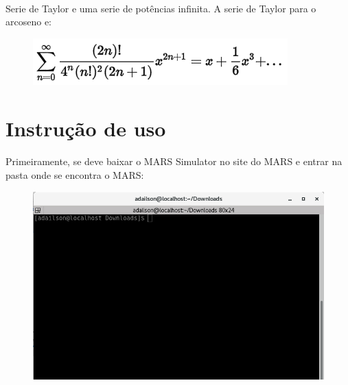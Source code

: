 \documentclass[a4paper, 12pt]{article}
\begin{document}
	\paragraph{}	S\´erie de Taylor \´e uma s\´erie de pot\^encias infinita. A s\´erie de Taylor para o arcoseno \´e:
	\begin{figure}[H]
		\centering
		\includegraphics[scale=0.5]{img10.png}
	\end{figure}
        
\section{Instru\c{c}\~ao de uso}
		\paragraph{}    Primeiramente, se deve baixar o MARS Simulator no site do MARS e entrar na pasta onde se encontra o MARS: 
		\begin{figure}[H]
			\centering
			\includegraphics[scale=0.5]{img1.png}
		\end{figure}
\end{document}
